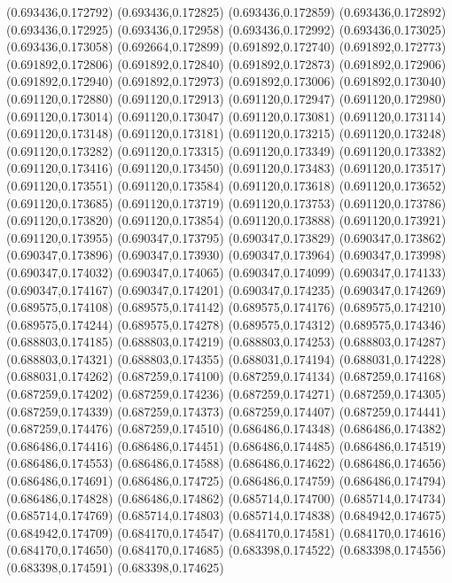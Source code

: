 (0.693436,0.172792)
(0.693436,0.172825)
(0.693436,0.172859)
(0.693436,0.172892)
(0.693436,0.172925)
(0.693436,0.172958)
(0.693436,0.172992)
(0.693436,0.173025)
(0.693436,0.173058)
(0.692664,0.172899)
(0.691892,0.172740)
(0.691892,0.172773)
(0.691892,0.172806)
(0.691892,0.172840)
(0.691892,0.172873)
(0.691892,0.172906)
(0.691892,0.172940)
(0.691892,0.172973)
(0.691892,0.173006)
(0.691892,0.173040)
(0.691120,0.172880)
(0.691120,0.172913)
(0.691120,0.172947)
(0.691120,0.172980)
(0.691120,0.173014)
(0.691120,0.173047)
(0.691120,0.173081)
(0.691120,0.173114)
(0.691120,0.173148)
(0.691120,0.173181)
(0.691120,0.173215)
(0.691120,0.173248)
(0.691120,0.173282)
(0.691120,0.173315)
(0.691120,0.173349)
(0.691120,0.173382)
(0.691120,0.173416)
(0.691120,0.173450)
(0.691120,0.173483)
(0.691120,0.173517)
(0.691120,0.173551)
(0.691120,0.173584)
(0.691120,0.173618)
(0.691120,0.173652)
(0.691120,0.173685)
(0.691120,0.173719)
(0.691120,0.173753)
(0.691120,0.173786)
(0.691120,0.173820)
(0.691120,0.173854)
(0.691120,0.173888)
(0.691120,0.173921)
(0.691120,0.173955)
(0.690347,0.173795)
(0.690347,0.173829)
(0.690347,0.173862)
(0.690347,0.173896)
(0.690347,0.173930)
(0.690347,0.173964)
(0.690347,0.173998)
(0.690347,0.174032)
(0.690347,0.174065)
(0.690347,0.174099)
(0.690347,0.174133)
(0.690347,0.174167)
(0.690347,0.174201)
(0.690347,0.174235)
(0.690347,0.174269)
(0.689575,0.174108)
(0.689575,0.174142)
(0.689575,0.174176)
(0.689575,0.174210)
(0.689575,0.174244)
(0.689575,0.174278)
(0.689575,0.174312)
(0.689575,0.174346)
(0.688803,0.174185)
(0.688803,0.174219)
(0.688803,0.174253)
(0.688803,0.174287)
(0.688803,0.174321)
(0.688803,0.174355)
(0.688031,0.174194)
(0.688031,0.174228)
(0.688031,0.174262)
(0.687259,0.174100)
(0.687259,0.174134)
(0.687259,0.174168)
(0.687259,0.174202)
(0.687259,0.174236)
(0.687259,0.174271)
(0.687259,0.174305)
(0.687259,0.174339)
(0.687259,0.174373)
(0.687259,0.174407)
(0.687259,0.174441)
(0.687259,0.174476)
(0.687259,0.174510)
(0.686486,0.174348)
(0.686486,0.174382)
(0.686486,0.174416)
(0.686486,0.174451)
(0.686486,0.174485)
(0.686486,0.174519)
(0.686486,0.174553)
(0.686486,0.174588)
(0.686486,0.174622)
(0.686486,0.174656)
(0.686486,0.174691)
(0.686486,0.174725)
(0.686486,0.174759)
(0.686486,0.174794)
(0.686486,0.174828)
(0.686486,0.174862)
(0.685714,0.174700)
(0.685714,0.174734)
(0.685714,0.174769)
(0.685714,0.174803)
(0.685714,0.174838)
(0.684942,0.174675)
(0.684942,0.174709)
(0.684170,0.174547)
(0.684170,0.174581)
(0.684170,0.174616)
(0.684170,0.174650)
(0.684170,0.174685)
(0.683398,0.174522)
(0.683398,0.174556)
(0.683398,0.174591)
(0.683398,0.174625)
